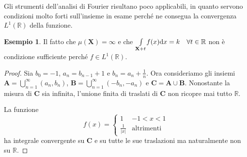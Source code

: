 \documentclass[12pt]{article}
\newcommand\rea{\mathbb R}
\newcommand\ins[1]{\mathbf #1}
\newcommand\intes[2]{\int\limits_{#1}\!#2\text dx}
\theoremstyle{definition}
\newtheorem{esem}{Esempio}
\begin{document}
Gli strumenti dell'analisi di Fourier risultano poco applicabili, in quanto servono condizioni molto forti sull'insieme in esame perché ne consegua la convergenza $L^1(\rea)$ della funzione.
\begin{esem}Il fatto che $\mu(\ins X)=\infty$ e che $\intes{\ins X+t}{f(x)}=k\quad\forall t\in\rea$ non è condizione sufficiente perché $f\in L^1(\rea)$.
\end{esem}
\begin{proof}Sia $b_0=-1$, $a_n=b_{n-1}+1$ e $b_n=a_n+\frac1n$. Ora consideriamo gli insiemi $\ins A=\bigcup_{n=1}^\infty(a_n,b_n)$, $\ins B=\bigcup_{n=1}^\infty(-b_n,-a_n)$ e $\ins C=\ins A\cup\ins B$. Nonostante la misura di $\ins C$ sia infinita, l'unione finita di traslati di $\ins C$ non ricopre mai tutto $\rea$.

La funzione
\begin{equation*}
f(x)=\left\{\begin{matrix}1&-1<x<1\\\frac1{|x|}&\text {altrimenti}
\end{matrix}\right.
\end{equation*}
ha integrale convergente su $\ins C$ e su tutte le sue traslazioni ma naturalmente non su $\rea$.
\end{proof}
\end{document}
